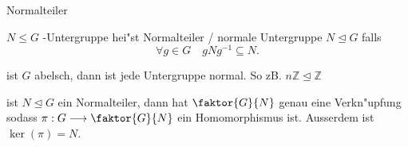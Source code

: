 \documentclass[class=article, crop=false]{standalone}
\begin{document}
\begin{zettel}{Normalteiler}
\begin{flashcard}[]{}
	\begin{definition}[Normalteiler]
		$N \leq G$ -Untergruppe hei"st Normalteiler / normale Untergruppe $N \trianglelefteq G$ falls
		\[
			\forall g \in  G \quad gNg^{-1}  \subseteq N
		.\]
	\end{definition}
\end{flashcard}

\begin{remark}
	ist $G$ abelsch, dann ist jede Untergruppe normal. So zB.
	$n \mathbb{Z} \trianglelefteq \mathbb{Z}$
\end{remark}

\begin{theorem}
	ist $N \trianglelefteq G$ ein Normalteiler, dann hat $\faktor{G}{N}$ genau eine Verkn"upfung sodass $\pi : G \longrightarrow \faktor{G}{N}$ ein Homomorphismus ist. Ausserdem ist $ \ker ( \pi ) = N$.
\end{theorem}

\end{zettel}
\end{document}
